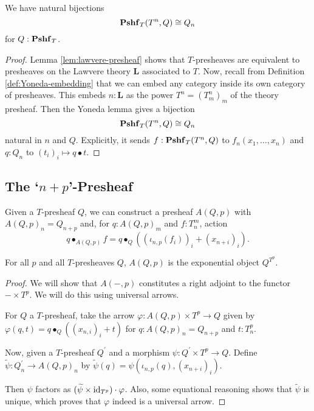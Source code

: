 \begin{lemma}\label{rem:presheaf-Yoneda}
  We have natural bijections
  \[ \mathbf{Pshf}_{T}(T^n, Q) \cong Q_n \]
  for $ Q : \mathbf{Pshf}_{T} $.
\end{lemma}
\begin{proof}
  Lemma \ref{lem:lawvere-presheaf} shows that $ T $-presheaves are equivalent to presheaves on the Lawvere theory $ \mathbf L $ associated to $ T $. Now, recall from Definition \ref{def:Yoneda-embedding} that we can embed any category inside its own category of presheaves. This embeds $ n: \mathbf L $ as the power $ T^n = (T_m^n)_m $ of the theory presheaf. Then the Yoneda lemma gives a bijection
  \[ \mathbf{Pshf}_{T}(T^n, Q) \cong Q_n \]
  natural in $ n $ and $ Q $. Explicitly, it sends $ f: \mathbf{Pshf}_{T}(T^n, Q) $ to $ f_n(x_1, \dots, x_n) $ and $ q: Q_n $ to $ (t_i)_i \mapsto q \bullet t $.
\end{proof}

\subsection{The `\texorpdfstring{$ n + p $}{n + p}'-Presheaf}

\begin{example}
  Given a $ T $-presheaf $ Q $, we can construct a presheaf $ A(Q, p) $ with $ A(Q, p)_n = Q_{n + p} $ and, for $ q: A(Q, p)_m $ and $ f: T_n^m $, action
  \[ q \bullet_{A(Q, p)} f = q \bullet_Q ((\iota_{n, p} (f_i))_i + (x_{n + i})_i). \]
\end{example}

\begin{lemma}\label{lem:plus-p-presheaf}
  For all $ p $ and all $ T $-presheaves $ Q $, $ A(Q, p) $ is the exponential object $ Q^{T^p} $.
\end{lemma}
\begin{proof}
  We will show that $ A(-, p) $ constitutes a right adjoint to the functor $ - \times T^p $. We will do this using universal arrows.

  For $ Q $ a $ T $-presheaf, take the arrow $ \varphi: A(Q, p) \times T^p \to Q $ given by $ \varphi(q, t) = q \bullet_Q ((x_{n, i})_i + t) $ for $ q: A(Q, p)_n = Q_{n + p} $ and $ t: T^p_n $.

  Now, given a $ T $-presheaf $ Q^\prime $ and a morphism $ \psi: Q^\prime \times T^p \to Q $. Define $ \widetilde \psi: Q^\prime_n \to A(Q, p)_n $ by $ \widetilde \psi(q) = \psi(\iota_{n, p}(q), (x_{n + i})_i) $.

  Then $ \psi $ factors as $ (\widetilde \psi \times \text{id}_{T^p}) \cdot \varphi $. Also, some equational reasoning shows that $ \widetilde \psi $ is unique, which proves that $ \varphi $ indeed is a universal arrow.
\end{proof}
